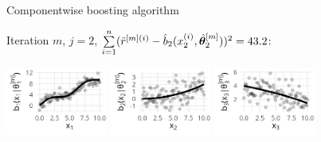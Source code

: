 \documentclass[11pt,compress,t,notes=noshow, xcolor=table]{beamer}
\begin{document}

\begin{vbframe}{Componentwise boosting algorithm}



{\footnotesize Iteration $m$, $j = 2$, $\sum  \limits_{i=1}^n (\tilde{r}^{[m](i)} - \hat{b}_2(x^{(i)}_2, \hat{\bm{\theta}}^{[m]}_2))^2 = 43.2$: }
\begin{center}
{\includegraphics[width=0.25\textwidth]{figure/boosting-cwb-bl1-points.png}}
\hspace*{0.5cm}
\includegraphics[width=0.25\textwidth]{figure/boosting-cwb-bl2-points.png}
\hspace*{0.5cm}
{\includegraphics[width=0.25\textwidth]{figure/boosting-cwb-bl3-points.png}}
\end{center}
\addtocounter{framenumber}{-1}
\end{vbframe}

\end{document}
